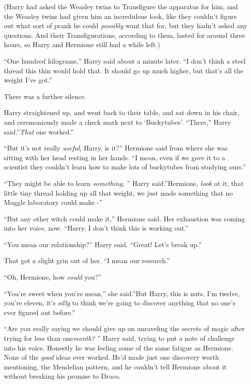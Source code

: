 (Harry had asked the Weasley twins to Transfigure the apparatus for him,
and the Weasley twins had given him an incredulous look, like they
couldn't figure out what sort of prank he could \emph{possibly} want
that for, but they hadn't asked any questions. And their
Transfigurations, according to them, lasted for around three hours, so
Harry and Hermione still had a while left.)

``One hundred kilograms,'' Harry said about a minute later. ``I don't
think a steel thread this thin would hold that. It should go up much
higher, but that's all the weight I've got.''

There was a further silence.

Harry straightened up, and went back to their table, and sat down in his
chair, and ceremoniously made a check mark next to `Buckytubes'.
``There,'' Harry said.''\emph{That} one worked.''

``But it's not really \emph{useful}, Harry, is it?'' Hermione said from
where she was sitting with her head resting in her hands. ``I mean, even
if we gave it to a scientist they couldn't learn how to make lots of
buckytubes from studying ours.''

``They might be able to learn \emph{something,} '' Harry said.''Hermione,
\emph{look} at it, that little tiny thread holding up all that weight,
we just made something that no Muggle laboratory could make -''

``But any other witch could make it,'' Hermione said. Her exhaustion was
coming into her voice, now. ``Harry, I don't think this is working
out.''

``You mean our relationship?'' Harry said. ``Great! Let's break up.''

That got a slight grin out of her. ``I mean our research.''

``Oh, Hermione, how \emph{could} you?''

``You're sweet when you're mean,'' she said.''But Harry, this is nuts,
I'm twelve, you're eleven, it's \emph{silly} to think we're going to
discover anything that no one's ever figured out before.''

``Are you really saying we should give up on unraveling the secrets of
magic after trying for less than one\emph{month?} '' Harry said, trying
to put a note of challenge into his voice. Honestly he was feeling some
of the same fatigue as Hermione. None of the \emph{good} ideas ever
worked. He'd made just one discovery worth mentioning, the Mendelian
pattern, and he couldn't tell Hermione about it without breaking his
promise to Draco.

